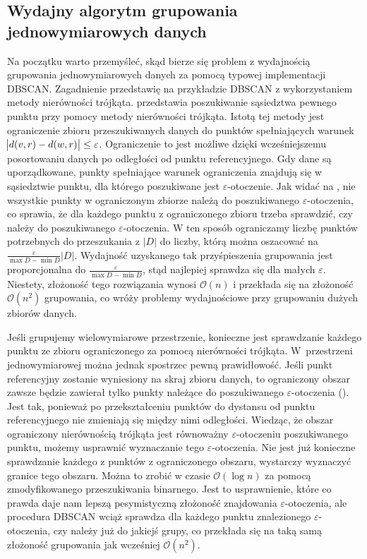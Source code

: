 \subsection{Wydajny algorytm grupowania jednowymiarowych danych}
Na początku warto przemyśleć, skąd bierze się problem z wydajnością grupowania jednowymiarowych danych za pomocą typowej implementacji DBSCAN. Zagadnienie przedstawię na przykładzie DBSCAN z wykorzystaniem metody nierówności trójkąta.  przedstawia poszukiwanie sąsiedztwa pewnego punktu przy pomocy metody nierówności trójkąta. Istotą tej metody jest ograniczenie zbioru przeszukiwanych danych do punktów spełniających warunek $ \abs{d(v, r) - d(w, r)} \le \varepsilon $. Ograniczenie to jest możliwe dzięki wcześniejszemu posortowaniu danych po odległości od punktu referencyjnego. Gdy dane są uporządkowane, punkty spełniające warunek ograniczenia znajdują się w sąsiedztwie punktu, dla którego poszukiwane jest $ \varepsilon $-otoczenie. Jak widać na , nie wszystkie punkty w ograniczonym zbiorze należą do poszukiwanego $ \varepsilon $-otoczenia, co sprawia, że dla każdego punktu z ograniczonego zbioru trzeba sprawdzić, czy należy do poszukiwanego $ \varepsilon $-otoczenia. W ten sposób ograniczamy liczbę punktów potrzebnych do przeszukania z $ |D| $ do liczby, którą można oszacować na $ \frac{\varepsilon}{\max{D}-\min{D}}|D| $. Wydajność uzyskanego tak przyśpieszenia grupowania jest proporcjonalna do $ \frac{\varepsilon}{\max{D}-\min{D}} $, stąd najlepiej sprawdza się dla małych $ \varepsilon $. Niestety, złożoność tego rozwiązania wynosi $ \mathcal{O}(n) $ i przekłada się na złożoność $ \mathcal{O}(n^2) $ grupowania, co wróży problemy wydajnościowe przy grupowaniu dużych zbiorów danych.\par



Jeśli grupujemy wielowymiarowe przestrzenie, konieczne jest sprawdzanie każdego punktu ze zbioru ograniczonego za pomocą nierówności trójkąta. \mbox{W przestrzeni} jednowymiarowej można jednak spostrzec pewną prawidłowość. Jeśli punkt referencyjny zostanie wyniesiony na skraj zbioru danych, to ograniczony obszar zawsze będzie zawierał tylko punkty należące do poszukiwanego $ \varepsilon $-otoczenia (). Jest tak, ponieważ po przekształceniu punktów do dystansu od punktu referencyjnego nie zmieniają się między nimi odległości. Wiedząc, że obszar ograniczony nierównością trójkąta jest równoważny $ \varepsilon $-otoczeniu poszukiwanego punktu, możemy usprawnić wyznaczanie tego $ \varepsilon $-otoczenia. Nie jest już konieczne sprawdzanie każdego z punktów z ograniczonego obszaru, wystarczy wyznaczyć granice tego obszaru. Można to zrobić w czasie $ \mathcal{O}(\log{}n) $ za pomocą zmodyfikowanego przeszukiwania binarnego\cite{binaryboundarysearch}. Jest to usprawnienie, które co prawda daje nam lepszą pesymistyczną złożoność znajdowania $ \varepsilon $-otoczenia, ale procedura DBSCAN wciąż sprawdza dla każdego punktu znalezionego $ \varepsilon $-otoczenia, czy należy już do jakiejś grupy, co przekłada się na taką samą złożoność grupowania jak wcześniej $ \mathcal{O}(n^2) $.\par

